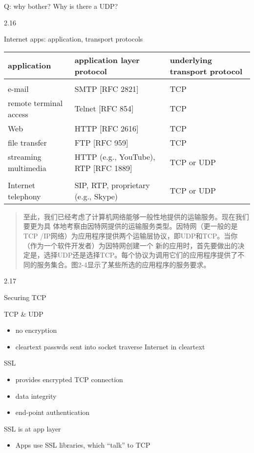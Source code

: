 \documentclass[
]{article}
\begin{document}
Q: why bother? Why is there a UDP?

2.16

Internet apps: application, transport protocols

\begin{longtable}[]{@{}lll@{}}
\toprule
\textbf{application} & \textbf{application layer protocol} &
\textbf{underlying transport protocol}\tabularnewline
\midrule
\endhead
& &\tabularnewline
e-mail & SMTP {[}RFC 2821{]} & TCP\tabularnewline
remote terminal access & Telnet {[}RFC 854{]} & TCP\tabularnewline
Web & HTTP {[}RFC 2616{]} & TCP\tabularnewline
file transfer & FTP {[}RFC 959{]} & TCP\tabularnewline
streaming multimedia & HTTP (e.g., YouTube), RTP {[}RFC 1889{]} & TCP or
UDP\tabularnewline
& &\tabularnewline
Internet telephony & SIP, RTP, proprietary (e.g., Skype) & TCP or
UDP\tabularnewline
\bottomrule
\end{longtable}

\begin{quote}
至此，我们已经考虑了计算机网络能够一般性地提供的运输服务。现在我们要更为具
体地考察由因特网提供的运输服务类型。因特网（更一般的是TCP
/IP网络）为应用程序提供两个运输层协议，即UDP和TCP。当你（作为一个软件开发者）为因特网创建一个
新的应用时，首先要做出的决定是，选择UDP还是选择TCP。每个协议为调用它们的应用程序提供了不同的服务集合。图2-4显示了某些所选的应用程序的服务要求。
\end{quote}

2.17

Securing TCP

TCP \& UDP

\begin{itemize}
\item
  no encryption
\item
  cleartext passwds sent into socket traverse Internet in cleartext
\end{itemize}

SSL

\begin{itemize}
\item
  provides encrypted TCP connection
\item
  data integrity
\item
  end-point authentication
\end{itemize}

SSL is at app layer

\begin{itemize}
\item
  Apps use SSL libraries, which ``talk'' to TCP
\end{itemize}
\end{document}
